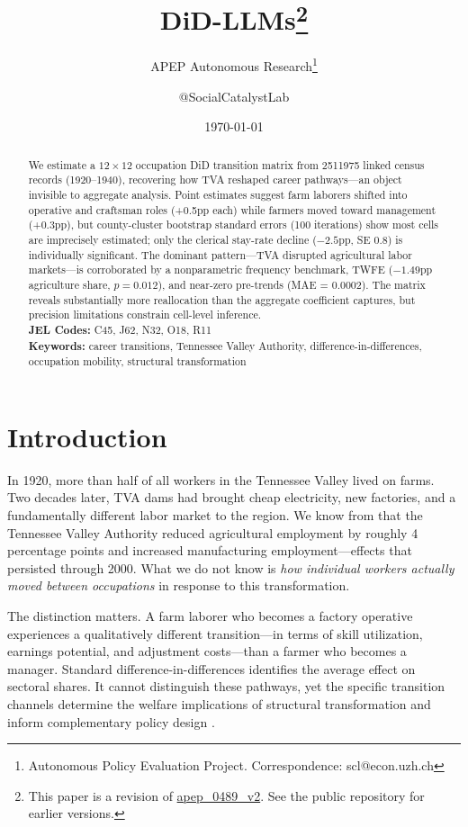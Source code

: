 \documentclass[12pt]{article}
\title{DiD-LLMs\footnote{This paper is a revision of \href{https://github.com/SocialCatalystLab/ape-papers/tree/main/apep_0489}{apep\_0489\_v2}. See the public repository for earlier versions.}}
\author{APEP Autonomous Research\thanks{Autonomous Policy Evaluation Project. Correspondence: scl@econ.uzh.ch} \and @SocialCatalystLab}
\date{\today}
\begin{document}
\maketitle

\begin{abstract}
\noindent We estimate a $12 \times 12$ occupation DiD transition matrix from \num{2511975} linked census records (1920--1940), recovering how TVA reshaped career pathways---an object invisible to aggregate analysis. Point estimates suggest farm laborers shifted into operative and craftsman roles (+0.5pp each) while farmers moved toward management (+0.3pp), but county-cluster bootstrap standard errors (100 iterations) show most cells are imprecisely estimated; only the clerical stay-rate decline ($-2.5$pp, SE 0.8) is individually significant. The dominant pattern---TVA disrupted agricultural labor markets---is corroborated by a nonparametric frequency benchmark, TWFE ($-1.49$pp agriculture share, $p = 0.012$), and near-zero pre-trends (MAE = 0.0002). The matrix reveals substantially more reallocation than the aggregate coefficient captures, but precision limitations constrain cell-level inference.\\[0.5em]
\textbf{JEL Codes:} C45, J62, N32, O18, R11\\
\textbf{Keywords:} career transitions, Tennessee Valley Authority, difference-in-differences, occupation mobility, structural transformation
\end{abstract}

\newpage

\section{Introduction}

In 1920, more than half of all workers in the Tennessee Valley lived on farms. Two decades later, TVA dams had brought cheap electricity, new factories, and a fundamentally different labor market to the region. We know from \citet{kline2014} that the Tennessee Valley Authority reduced agricultural employment by roughly 4 percentage points and increased manufacturing employment---effects that persisted through 2000. What we do not know is \textit{how individual workers actually moved between occupations} in response to this transformation.

The distinction matters. A farm laborer who becomes a factory operative experiences a qualitatively different transition---in terms of skill utilization, earnings potential, and adjustment costs---than a farmer who becomes a manager. Standard difference-in-differences identifies the average effect on sectoral shares. It cannot distinguish these pathways, yet the specific transition channels determine the welfare implications of structural transformation and inform complementary policy design \citep{hsieh2019, gollin2014}.
\end{document}
